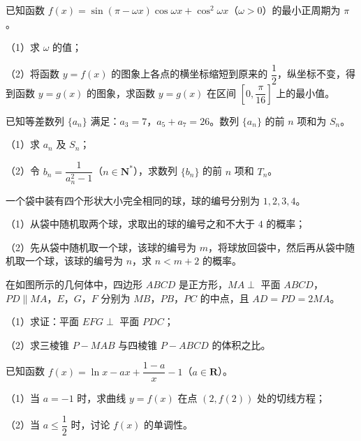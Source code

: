 \begin{question}
已知函数 $f(x)=\sin(\pi-\omega x)\cos\omega x+\cos^2\omega x$（$\omega>0$）的最小正周期为 $\pi$。

（1）求 $\omega$ 的值；

（2）将函数 $y=f(x)$ 的图象上各点的横坐标缩短到原来的 $\dfrac12$，纵坐标不变，得到函数 $y=g(x)$ 的图象，求函数 $y=g(x)$ 在区间 $\left[0,\dfrac\pi{16}\right]$ 上的最小值。

\end{question}
\begin{question}
已知等差数列 $\{a_n\}$ 满足：$a_3=7$，$a_5+a_7=26$。数列 $\{a_n\}$ 的前 $n$ 项和为 $S_n$。

（1）求 $a_n$ 及 $S_n$；

（2）令 $b_n=\dfrac1{a_n^2-1}$（$n\in\mathbf N^*$），求数列 $\{b_n\}$ 的前 $n$ 项和 $T_n$。

\end{question}
\begin{question}
一个袋中装有四个形状大小完全相同的球，球的编号分别为 $1,2,3,4$。

（1）从袋中随机取两个球，求取出的球的编号之和不大于 $4$ 的概率；

（2）先从袋中随机取一个球，该球的编号为 $m$，将球放回袋中，然后再从袋中随机取一个球，该球的编号为 $n$，求 $n<m+2$ 的概率。

\Needspace{0.4\textheight}
\end{question}
\begingroup
\renewenvironment{question}{\Needspace{0.5\textheight}}{}
\begin{question}
在如图所示的几何体中，四边形 $ABCD$ 是正方形，$MA\perp$ 平面 $ABCD$，$PD\parallel MA$，$E$，$G$，$F$ 分别为 $MB$，$PB$，$PC$ 的中点，且 $AD=PD=2MA$。

（1）求证：平面 $EFG\perp$ 平面 $PDC$；

（2）求三棱锥 $P-MAB$ 与四棱锥 $P-ABCD$ 的体积之比。
\nopagebreak[4]
\begin{center}\end{center}
\nopagebreak[4]
\end{question}
\endgroup
\begin{question}
已知函数 $f(x)=\ln x-ax+\dfrac{1-a}{x}-1$（$a\in\mathbf R$）。

（1）当 $a=-1$ 时，求曲线 $y=f(x)$ 在点 $(2,f(2))$ 处的切线方程；

（2）当 $a\leqslant\dfrac12$ 时，讨论 $f(x)$ 的单调性。

\Needspace{0.4\textheight}
\end{question}

